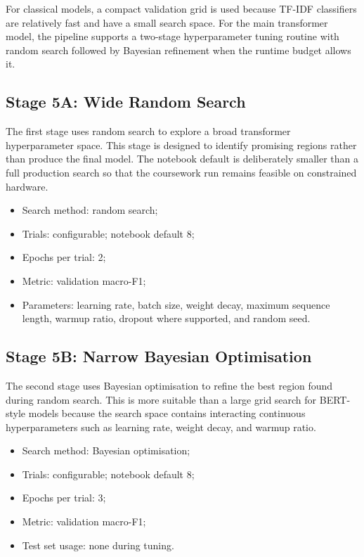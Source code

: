 \documentclass[11pt]{article}
\begin{document}
For classical models, a compact validation grid is used because TF-IDF classifiers are relatively fast and have a small search space. For the main transformer model, the pipeline supports a two-stage hyperparameter tuning routine with random search followed by Bayesian refinement when the runtime budget allows it.

\subsection{Stage 5A: Wide Random Search}

The first stage uses random search to explore a broad transformer hyperparameter space. This stage is designed to identify promising regions rather than produce the final model. The notebook default is deliberately smaller than a full production search so that the coursework run remains feasible on constrained hardware.

\begin{itemize}[leftmargin=*]
    \item Search method: random search;
    \item Trials: configurable; notebook default 8;
    \item Epochs per trial: 2;
    \item Metric: validation macro-F1;
    \item Parameters: learning rate, batch size, weight decay, maximum sequence length, warmup ratio, dropout where supported, and random seed.
\end{itemize}

\subsection{Stage 5B: Narrow Bayesian Optimisation}

The second stage uses Bayesian optimisation to refine the best region found during random search. This is more suitable than a large grid search for BERT-style models because the search space contains interacting continuous hyperparameters such as learning rate, weight decay, and warmup ratio.

\begin{itemize}[leftmargin=*]
    \item Search method: Bayesian optimisation;
    \item Trials: configurable; notebook default 8;
    \item Epochs per trial: 3;
    \item Metric: validation macro-F1;
    \item Test set usage: none during tuning.
\end{itemize}
\end{document}
